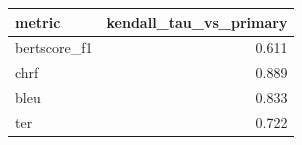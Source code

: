 \begin{tabular}{lr}
\toprule
metric & kendall\_tau\_vs\_primary \\
\midrule
bertscore\_f1 & 0.611 \\
chrf & 0.889 \\
bleu & 0.833 \\
ter & 0.722 \\
\bottomrule
\end{tabular}
